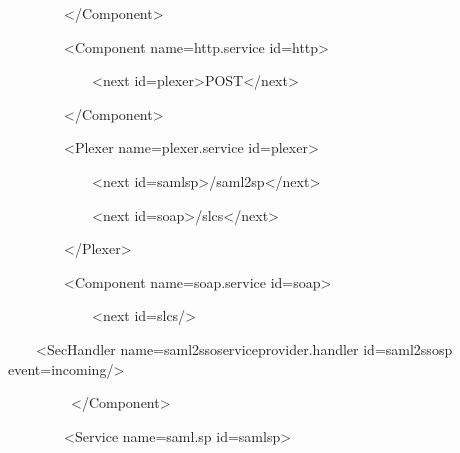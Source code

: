 \documentclass{article}
\begin{document}
{\ttfamily\color{black}
\ \ \ \ \ \ \ \ {\textless}/Component{\textgreater} }

{\ttfamily\color{black}
\ \ \ \ \ \ \ \ {\textless}Component
name={\textquotedbl}http.service{\textquotedbl}
id={\textquotedbl}http{\textquotedbl}{\textgreater} }

{\ttfamily\color{black}
\ \ \ \ \ \ \ \ \ \ \ \ {\textless}next
id={\textquotedbl}plexer{\textquotedbl}{\textgreater}POST{\textless}/next{\textgreater}
}

{\ttfamily\color{black}
\ \ \ \ \ \ \ \ {\textless}/Component{\textgreater} }

{\ttfamily\color{black}
\ \ \ \ \ \ \ \ {\textless}Plexer
name={\textquotedbl}plexer.service{\textquotedbl}
id={\textquotedbl}plexer{\textquotedbl}{\textgreater} }

{\ttfamily\color{black}
\ \ \ \ \ \ \ \ \ \ \ \ {\textless}next
id={\textquotedbl}samlsp{\textquotedbl}{\textgreater}/saml2sp{\textless}/next{\textgreater}
}

{\ttfamily\color{black}
\ \ \ \ \ \ \ \ \ \ \ \ {\textless}next
id={\textquotedbl}soap{\textquotedbl}{\textgreater}/slcs{\textless}/next{\textgreater}
}

{\ttfamily\color{black}
\ \ \ \ \ \ \ \ {\textless}/Plexer{\textgreater} }

{\ttfamily\color{black}
\ \ \ \ \ \ \ \ {\textless}Component
name={\textquotedbl}soap.service{\textquotedbl}
id={\textquotedbl}soap{\textquotedbl}{\textgreater} }

{\ttfamily\color{black}
\ \ \ \ \ \ \ \ \ \ \ \ {\textless}next
id={\textquotedbl}slcs{\textquotedbl}/{\textgreater} }

{\ttfamily\color{black}
\ \ \ \ {\textless}SecHandler
name={\textquotedbl}\textcolor[rgb]{0.8627451,0.13725491,0.0}{saml2ssoserviceprovider.handler}{\textquotedbl}
id={\textquotedbl}saml2ssosp{\textquotedbl}
event={\textquotedbl}incoming{\textquotedbl}/{\textgreater}}

{\ttfamily\color{black}
\ \ \ \ \ \ \ \ \ {\textless}/Component{\textgreater} }

{\ttfamily\color{black}
\ \ \ \ \ \ \ \ {\textless}Service
name={\textquotesingle}\textcolor[rgb]{0.77254903,0.0,0.043137256}{saml.sp}{\textquotesingle}
id={\textquotesingle}samlsp{\textquotesingle}{\textgreater} }
\end{document}
